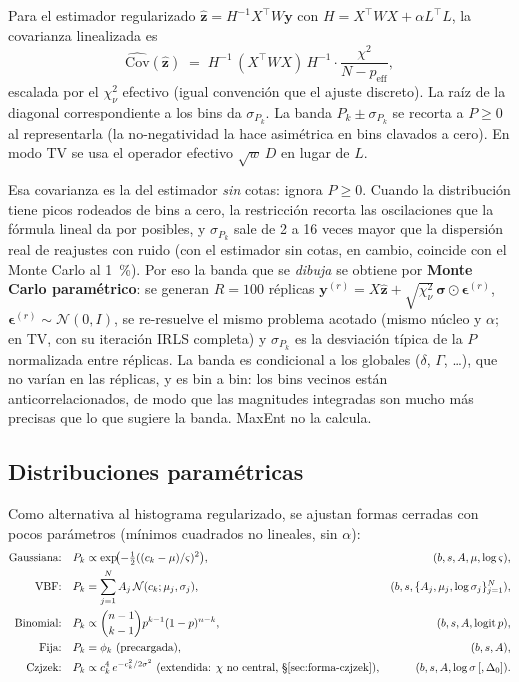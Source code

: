 Para el estimador regularizado $\hat{\bm z}=H^{-1}X^\top W\bm y$ con
$H=X^\top WX+\alpha L^\top L$, la covarianza linealizada es
\begin{equation}
  \widehat{\mathrm{Cov}}(\hat{\bm z}) \;=\; H^{-1}\,(X^\top WX)\,H^{-1}\cdot\frac{\chi^2}{N-p_{\text{eff}}},
\end{equation}
escalada por el $\chi^2_\nu$ efectivo (igual convención que el ajuste discreto). La
raíz de la diagonal correspondiente a los bins da $\sigma_{P_k}$. La banda
$P_k\pm\sigma_{P_k}$ se recorta a $P\ge0$ al representarla (la no-negatividad la
hace asimétrica en bins clavados a cero). En modo TV se usa el operador efectivo
$\sqrt{w}\,D$ en lugar de $L$.

Esa covarianza es la del estimador \emph{sin} cotas: ignora $P\ge0$. Cuando la
distribución tiene picos rodeados de bins a cero, la restricción recorta las
oscilaciones que la fórmula lineal da por posibles, y $\sigma_{P_k}$ sale de 2 a 16
veces mayor que la dispersión real de reajustes con ruido (con el estimador sin
cotas, en cambio, coincide con el Monte Carlo al 1~\%). Por eso la banda que se
\emph{dibuja} se obtiene por \textbf{Monte Carlo paramétrico}: se generan
$R=100$ réplicas $\bm y^{(r)}=X\hat{\bm z}+\sqrt{\chi^2_\nu}\,\bm\sigma\odot\bm\epsilon^{(r)}$,
$\bm\epsilon^{(r)}\sim\mathcal N(0,I)$, se re-resuelve el mismo problema acotado
(mismo núcleo y $\alpha$; en TV, con su iteración IRLS completa) y
$\sigma_{P_k}$ es la desviación típica de la $P$ normalizada entre réplicas. La
banda es condicional a los globales ($\delta$, $\Gamma$, \dots), que no varían en
las réplicas, y es bin a bin: los bins vecinos están anticorrelacionados, de modo
que las magnitudes integradas son mucho más precisas que lo que sugiere la banda.
MaxEnt no la calcula.

\subsection{Distribuciones paramétricas}
Como alternativa al histograma regularizado, se ajustan formas cerradas con pocos
parámetros (mínimos cuadrados no lineales, sin $\alpha$):
\begin{align}
  \text{Gaussiana:}\quad & P_k\propto \exp\!\bigl(-\tfrac12((c_k-\mu)/\varsigma)^2\bigr), & (b,s,A,\mu,\log\varsigma),\\
  \text{VBF:}\quad & P_k = \sum_{j=1}^{N} A_j\,\mathcal N(c_k;\mu_j,\sigma_j), & (b,s,\{A_j,\mu_j,\log\sigma_j\}_{j=1}^N),\\
  \text{Binomial:}\quad & P_k\propto \binom{n-1}{k-1}p^{k-1}(1-p)^{n-k}, & (b,s,A,\mathrm{logit}\,p),\\
  \text{Fija:}\quad & P_k=\phi_k\ \text{(precargada)}, & (b,s,A),\\
  \text{Czjzek:}\quad & P_k\propto c_k^{4}\,e^{-c_k^2/2\sigma^2}\ \text{(extendida: $\chi$ no central, §\ref{sec:forma-czjzek})}, & (b,s,A,\log\sigma\,[,\Delta_0]).
\end{align}


